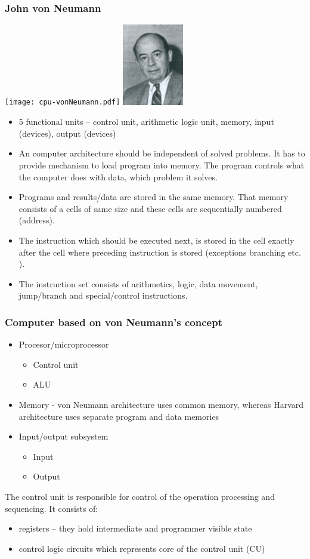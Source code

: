 \documentclass{beamer}
\begin{document}
\begin{frame}[shrink=10]
\frametitle{John von Neumann}
\begin{center}
\texttt{[image: cpu-vonNeumann.pdf]}
\hfill
\includegraphics[width=0.2\textwidth]{fig/vonNeumann.png}
\end{center}
\begin{itemize}
\item 5 functional units – control unit, arithmetic logic unit, memory, input (devices), output (devices)
\item An computer architecture should be independent of solved problems. It has to provide mechanism to load program into memory. The program controls what the computer does with data, which problem it solves.
\item Programs and results/data are stored in the same memory. That memory consists of a cells of same size and these cells are sequentially numbered (address).
\item The instruction which should be executed next, is stored in the cell exactly after the cell where preceding instruction is stored (exceptions branching etc. ). 
\item The instruction set consists of arithmetics, logic, data movement, jump/branch and special/control instructions.
\end{itemize}
\end{frame}


\begin{frame}
\frametitle{Computer based on von Neumann's concept}

\begin{itemize}
\item Procesor/microprocessor
\begin{itemize}
\item Control unit
\item ALU
\end{itemize}
\item Memory - von Neumann architecture uses common memory, whereas Harvard architecture uses separate program and data memories
\item Input/output subsystem
\begin{itemize}
\item Input
\item Output
\end{itemize}
\end{itemize}
The control unit is responsible for control of the operation processing and sequencing. It consists of:
\begin{itemize}
\item registers – they hold intermediate and programmer visible state
\item control logic circuits which represents core of the control unit (CU)
\end{itemize}
\end{frame}
\end{document}
